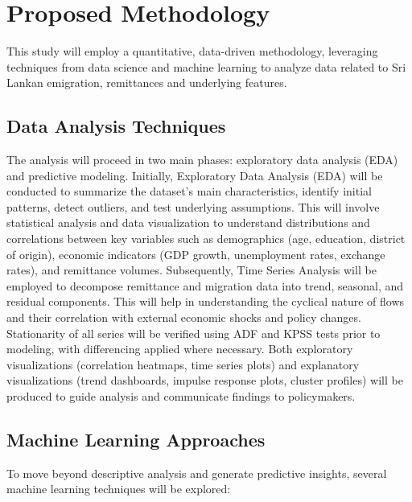 \documentclass[sigconf]{acmart}
\begin{document}
\section{Proposed Methodology}

This study will employ a quantitative, data-driven methodology, leveraging techniques from data science and machine learning to analyze data related to Sri Lankan emigration, remittances and underlying features.

\subsection{Data Analysis Techniques}

The analysis will proceed in two main phases: exploratory data analysis (EDA) and predictive modeling. Initially, Exploratory Data Analysis (EDA) will be conducted to summarize the dataset's main characteristics, identify initial patterns, detect outliers, and test underlying assumptions. This will involve statistical analysis and data visualization to understand distributions and correlations between key variables such as demographics (age, education, district of origin), economic indicators (GDP growth, unemployment rates, exchange rates), and remittance volumes. Subsequently, Time Series Analysis will be employed to decompose remittance and migration data into trend, seasonal, and residual components. This will help in understanding the cyclical nature of flows and their correlation with external economic shocks and policy changes. Stationarity of all series will be verified using ADF and KPSS tests prior to modeling, with differencing applied where necessary. Both exploratory visualizations (correlation heatmaps, time series plots) and explanatory visualizations (trend dashboards, impulse response plots, cluster profiles) will be produced to guide analysis and communicate findings to policymakers.

\subsection{Machine Learning Approaches}

To move beyond descriptive analysis and generate predictive insights, several machine learning techniques will be explored:
\end{document}
